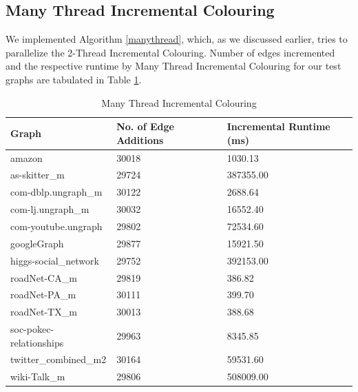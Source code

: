 \documentclass[MTech]{iitmdiss}
\begin{document}
\subsection{Many Thread Incremental Colouring}
We implemented Algorithm \ref{manythread}, which, as we discussed earlier, tries to parallelize the 2-Thread Incremental Colouring. Number of edges incremented and the respective runtime by Many Thread Incremental Colouring for our test graphs are tabulated in Table \ref{manyInc}.



\begin{table}[]
\centering
\begin{tabular}{|l|l|l|}
\hline
Graph                   & No. of Edge Additions & Incremental Runtime (ms) \\ \hline
amazon                  & 30018                 & 1030.13                  \\ \hline
as-skitter\_m           & 29724                 & 387355.00                \\ \hline
com-dblp.ungraph\_m     & 30122                 & 2688.64                  \\ \hline
com-lj.ungraph\_m       & 30032                 & 16552.40                 \\ \hline
com-youtube.ungraph     & 29802                 & 72534.60                 \\ \hline
googleGraph             & 29877                 & 15921.50                 \\ \hline
higgs-social\_network   & 29752                 & 392153.00                \\ \hline
roadNet-CA\_m           & 29819                 & 386.82                   \\ \hline
roadNet-PA\_m           & 30111                 & 399.70                   \\ \hline
roadNet-TX\_m           & 30013                 & 388.68                   \\ \hline
soc-pokec-relationships & 29963                 & 8345.85                  \\ \hline
twitter\_combined\_m2   & 30164                 & 59531.60                 \\ \hline
wiki-Talk\_m            & 29806                 & 508009.00                \\ \hline
\end{tabular}
\caption{Many Thread Incremental Colouring}
\label{manyInc}
\end{table}
\end{document}
